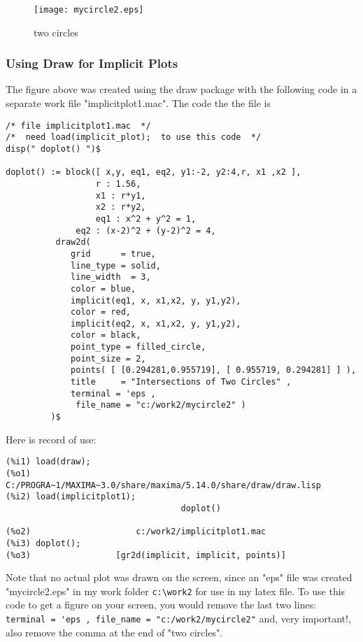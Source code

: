 \documentclass[12pt]{article}
\begin{document}
\smallskip
\begin{figure} [h]
   \centerline{\texttt{[image: mycircle2.eps]} }
	\caption{two circles}
\end{figure}
  
\subsubsection{Using Draw for Implicit Plots}
The figure above was created using the draw package with the following code
  in a separate work file "implicitplot1.mac".
The code the the file is
\small
\begin{verbatim}
/* file implicitplot1.mac  */
/*  need load(implicit_plot);  to use this code  */
disp(" doplot() ")$

doplot() := block([ x,y, eq1, eq2, y1:-2, y2:4,r, x1 ,x2 ],
                  r : 1.56,
                  x1 : r*y1,
                  x2 : r*y2,
                  eq1 : x^2 + y^2 = 1,
              eq2 : (x-2)^2 + (y-2)^2 = 4,
          draw2d( 
             grid      = true,
             line_type = solid,
             line_width  = 3,
             color = blue,
             implicit(eq1, x, x1,x2, y, y1,y2),
             color = red,
             implicit(eq2, x, x1,x2, y, y1,y2),
             color = black,
             point_type = filled_circle,
             point_size = 2,
             points( [ [0.294281,0.955719], [ 0.955719, 0.294281] ] ),
             title     = "Intersections of Two Circles" ,
             terminal = 'eps ,
			  file_name = "c:/work2/mycircle2" )
         )$
\end{verbatim}
\normalsize
Here is record of use:
\small
\begin{verbatim}
(%i1) load(draw);
(%o1)   C:/PROGRA~1/MAXIMA~3.0/share/maxima/5.14.0/share/draw/draw.lisp
(%i2) load(implicitplot1);
                                   doplot() 

(%o2)                     c:/work2/implicitplot1.mac
(%i3) doplot();
(%o3)                 [gr2d(implicit, implicit, points)]
\end{verbatim}
\normalsize
Note that no actual plot was drawn on the screen, since an "eps" file
  was created "mycircle2.eps" in my work folder \verb|c:\work2| for use
  in my latex file.
To use this code to get a figure on your screen, you would remove the last two
  lines: \verb| terminal = 'eps , file_name = "c:/work2/mycircle2"| and,
  very important!, also remove the comma at the end of "two circles".
\end{document}
